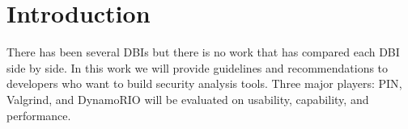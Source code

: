 \section {Introduction} 
\label{sec:intro}
There has been several DBIs but there is no work that has compared each DBI side by side. In this work we will provide guidelines and recommendations to developers who want to build security analysis tools. Three major players: PIN\cite{Luk:2005:PBC:1065010.1065034}, Valgrind\cite{Nethercote:2007:VFH:1250734.1250746}, and DynamoRIO\cite{Bruening:2004:ETC:1087758} will be evaluated on usability, capability, and performance.
